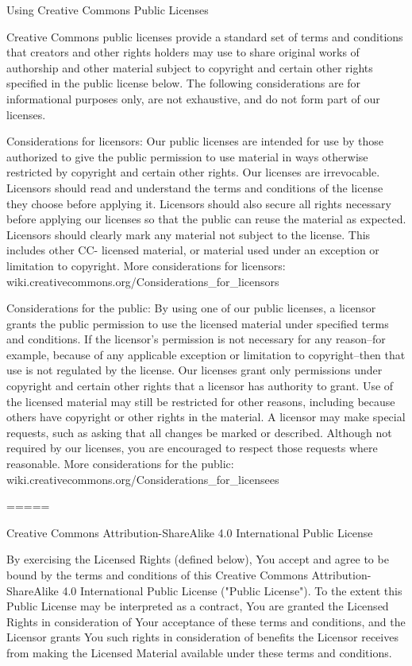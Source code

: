 Using Creative Commons Public Licenses

Creative Commons public licenses provide a standard set of terms and
conditions that creators and other rights holders may use to share
original works of authorship and other material subject to copyright
and certain other rights specified in the public license below. The
following considerations are for informational purposes only, are not
exhaustive, and do not form part of our licenses.

     Considerations for licensors: Our public licenses are
     intended for use by those authorized to give the public
     permission to use material in ways otherwise restricted by
     copyright and certain other rights. Our licenses are
     irrevocable. Licensors should read and understand the terms
     and conditions of the license they choose before applying it.
     Licensors should also secure all rights necessary before
     applying our licenses so that the public can reuse the
     material as expected. Licensors should clearly mark any
     material not subject to the license. This includes other CC-
     licensed material, or material used under an exception or
     limitation to copyright. More considerations for licensors:
	wiki.creativecommons.org/Considerations\_for\_licensors

     Considerations for the public: By using one of our public
     licenses, a licensor grants the public permission to use the
     licensed material under specified terms and conditions. If
     the licensor's permission is not necessary for any reason--for
     example, because of any applicable exception or limitation to
     copyright--then that use is not regulated by the license. Our
     licenses grant only permissions under copyright and certain
     other rights that a licensor has authority to grant. Use of
     the licensed material may still be restricted for other
     reasons, including because others have copyright or other
     rights in the material. A licensor may make special requests,
     such as asking that all changes be marked or described.
     Although not required by our licenses, you are encouraged to
     respect those requests where reasonable. More considerations
     for the public:
	wiki.creativecommons.org/Considerations\_for\_licensees

=====

Creative Commons Attribution-ShareAlike 4.0 International Public
License

By exercising the Licensed Rights (defined below), You accept and agree
to be bound by the terms and conditions of this Creative Commons
Attribution-ShareAlike 4.0 International Public License ("Public
License"). To the extent this Public License may be interpreted as a
contract, You are granted the Licensed Rights in consideration of Your
acceptance of these terms and conditions, and the Licensor grants You
such rights in consideration of benefits the Licensor receives from
making the Licensed Material available under these terms and
conditions.



